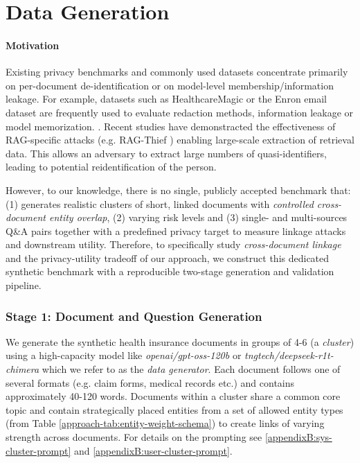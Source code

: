 \section{Data Generation}\label{evaluation-subsec:data-generation}
\paragraph{Motivation}
Existing privacy benchmarks and commonly used datasets concentrate primarily on per-document de-identification or on model-level membership/information leakage. For example, datasets such as HealthcareMagic or the Enron email dataset are frequently used to evaluate redaction methods, information leakage or model memorization. \cite{ragSAGE, ragThief, goodAndBad, proactivePrivAmnesiaLLM}. Recent studies have demonstracted the effectiveness of RAG-specific attacks (e.g. RAG-Thief \cite{ragThief}) enabling large-scale extraction of retrieval data. This allows an adversary to extract large numbers of quasi-identifiers, leading to potential reidentification of the person. \cite{simpleDemographic, netflixDeAnon} 

However, to our knowledge, there is no single, publicly accepted benchmark that: (1) generates realistic clusters of short, linked documents with \textit{controlled cross-document entity overlap}, (2) varying risk levels and (3) single- and multi-sources Q\&A pairs together with a predefined privacy target to measure linkage attacks and downstream utility. Therefore, to specifically study \textit{cross-document linkage} and the privacy-utility tradeoff of our approach, we construct this dedicated synthetic benchmark with a reproducible two-stage generation and validation pipeline. 

\subsubsection{Stage 1: Document and Question Generation}
We generate the synthetic health insurance documents in groups of 4-6 (a \textit{cluster}) using a high-capacity model like \textit{openai/gpt-oss-120b} or \textit{tngtech/deepseek-r1t-chimera} which we refer to as the \textit{data generator}. Each document follows one of several formats (e.g. claim forms, medical records etc.) and contains approximately 40-120 words. Documents within a cluster share a common core topic and contain strategically placed entities from a set of allowed entity types (from Table \ref{approach-tab:entity-weight-schema}) to create links of varying strength across documents. For details on the prompting see \ref{appendixB:sys-cluster-prompt} and \ref{appendixB:user-cluster-prompt}. 

